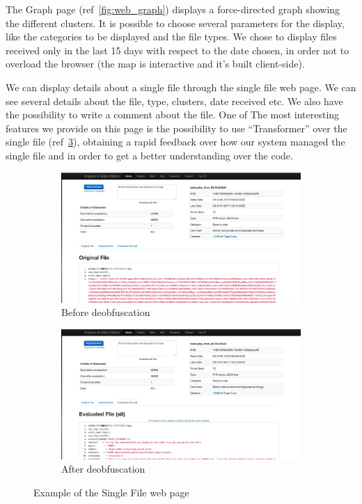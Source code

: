 The Graph page (ref~\ref{fig:web_graph}) displays a force-directed graph showing the different clusters. It is possible to choose several parameters for the display, like the categories to be displayed and the file types. We chose to display files received only in the last 15 days with respect to the date chosen, in order not to overload the browser (the map is interactive and it's built client-side).

We can display details about a single file through the single file web page. We can see several details about the file, type, clusters, date received etc. We also have the possibility to write a comment about the file.
One of The most interesting features we provide on this page is the possibility to use ``Transformer'' over the single file (ref~\ref{fig:deobfDouble}), obtaining a rapid feedback over how our system managed the single file and in order to get a better understanding over the code.

\begin{figure}
\centering
\begin{subfigure}{.5\textwidth}
  \centering
  \includegraphics[width=1.0\linewidth]{Images/obf_file.jpg}
  \caption{Before deobfuscation}
  \label{fig:sub1}
\end{subfigure}%
\begin{subfigure}{.5\textwidth}
  \centering
  \includegraphics[width=1.0\linewidth]{Images/deobf_file.jpg}
  \caption{After deobfuscation}
  \label{fig:sub2}
\end{subfigure}
\caption{Example of the Single File web page}
\label{fig:deobfDouble}
\end{figure}



